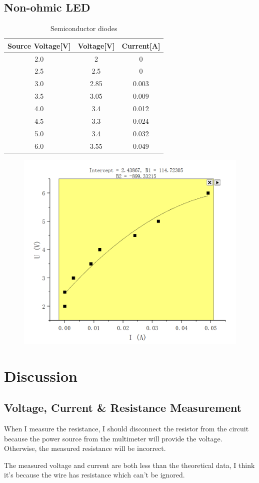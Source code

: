 \documentclass[12pt]{article}
\begin{document}
\subsection{Non-ohmic LED}
\begin{table}[H]
\centering
\begin{tabular}{|c|c|c|}
\hline
Source Voltage[V] &Voltage[V]& Current[A] \\ \hline
2.0        &2& 0          \\ \hline
2.5        &2.5& 0          \\ \hline
3.0        &2.85& 0.003      \\ \hline
3.5        &3.05& 0.009      \\ \hline
4.0        &3.4& 0.012      \\ \hline
4.5        &3.3& 0.024      \\ \hline
5.0        &3.4& 0.032      \\ \hline
6.0        &3.55& 0.049      \\ \hline
\end{tabular}
\caption{Semiconductor diodes}
\end{table}
\begin{figure}[H]
\centering
\includegraphics[scale=0.45]{P7.jpg}
\end{figure}
\section{Discussion}
\subsection{Voltage, Current \& Resistance Measurement}
When I measure the resistance, I should disconnect the resistor from the circuit because the power source from the multimeter will provide the voltage. Otherwise, the measured resistance will be incorrect.
\par The measured voltage and current are both less than the theoretical data, I think it's because the wire has resistance which can't be ignored.
\end{document}

